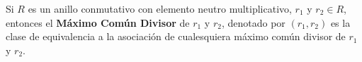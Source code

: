 \begin{definicion}
    Si $R$ es un anillo conmutativo con elemento neutro multiplicativo, $r_1$ y $r_2\in R$, entonces el \textbf{Máximo Común Divisor} de $r_1$ y $r_2$, denotado por $(r_1,r_2)$ es la clase de equivalencia a la asociación de cualesquiera máximo común divisor de $r_1$ y $r_2$. 
\end{definicion}

